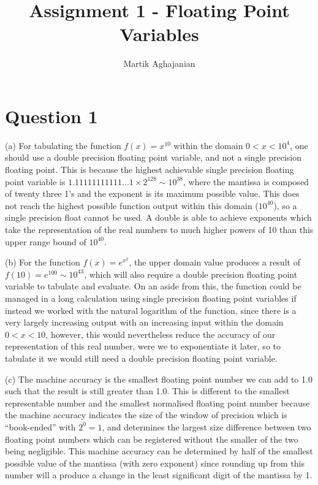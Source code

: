 \documentclass{article}
\title{Assignment 1 - Floating Point Variables}
\author{Martik Aghajanian}
\date{}
\begin{document}
\maketitle
\section{Question 1}

(a) For tabulating the function $f(x)=x^{10}$ within the domain $0<x<10^4$, one should use a double precision floating point variable, and not a single precision floating point. This is because the highest achievable single precision floating point variable is $1.11111111111...1\times{2^{128}}\sim{10^{38}}$, where the mantissa is composed of twenty three 1's and the exponent is its maximum possible value. This does not reach the highest possible function output within this domain ($10^{40}$), so a single precision float cannot be used. A double is able to achieve exponents which take the representation of the real numbers to much higher powers of 10 than this upper range bound of $10^{40}$.
\newline

\noindent (b) For the function $f(x)=e^{x^2}$, the upper domain value produces a result of $f(10)=e^{100}\sim{10^{43}}$, which will also require a double precision floating point variable to tabulate and evaluate. On an aside from this, the function could be managed in a long calculation using single precision floating point variables if instead we worked with the natural logarithm of the function, since there is a very largely increasing output with an increasing input within the domain $0<x<10$, however, this would nevertheless reduce the accuracy of our representation of this real number, were we to exponentiate it later, so to tabulate it we would still need a double precision floating point variable.
\newline

\noindent (c) The machine accuracy is the smallest floating point number we can add to 1.0 such that the result is still greater than 1.0. This is different to the smallest representable number and the smallest normalised floating point number because the machine accuracy indicates the size of the window of precision which is “book-ended” with $2^0=1$, and determines the largest size difference between two floating point numbers which can be registered without the smaller of the two being negligible. This machine accuracy can be determined by half of the smallest possible value of the mantissa (with zero exponent) since rounding up from this number will a produce a change in the least significant digit of the mantissa by 1.
\end{document}
